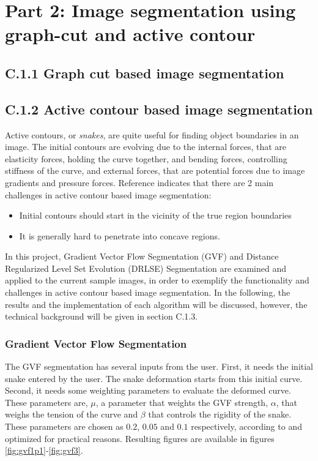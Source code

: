 \documentclass{article}
\begin{document}
\clearpage
\section*{Part 2: Image segmentation using graph-cut and active contour}

\subsection*{C.1.1 Graph cut based image segmentation}

\subsection*{C.1.2 Active contour based image segmentation}
Active contours, or \emph{snakes}, are quite useful for finding object boundaries in an image. The initial contours are evolving due to the internal forces, that are elasticity forces, holding the curve together, and bending forces, controlling stiffness of the curve, and external forces, that are potential forces due to image gradients and pressure forces. Reference \cite{gvf} indicates that there are 2 main challenges in active contour based image segmentation:
\begin{itemize}
\item Initial contours should start in the vicinity of the true region boundaries
\item It is generally hard to penetrate into concave regions.
\end{itemize}
In this project, Gradient Vector Flow Segmentation (GVF) \cite{gvf} and Distance Regularized Level Set Evolution (DRLSE) Segmentation \cite{drlse} are examined and applied to the current sample images, in order to exemplify the functionality and challenges in active contour based image segmentation. In the following, the results and the implementation of each algorithm will be discussed, however, the technical background will be given in section C.1.3. 



\subsubsection*{Gradient Vector Flow Segmentation}
The GVF segmentation has several inputs from the user. First, it needs the initial snake entered by the user. The snake deformation starts from this initial curve. Second, it needs some weighting parameters to evaluate the deformed curve. These parameters are, $\mu$, a parameter that weights the GVF strength, $\alpha$, that weighs the tension of the curve and $\beta$ that controls the rigidity of the snake. These parameters are chosen as $0.2$, $0.05$ and $0.1$ respectively, according to \cite{gvf} and optimized for practical reasons. Resulting figures are available in figures \ref{fig:gvf1p1}-\ref{fig:gvf3}.
\end{document}
